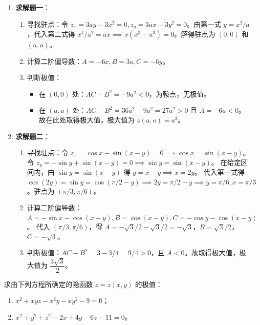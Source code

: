 \documentclass[lang=cn,11pt]{elegantbook}
\begin{document}
\begin{solution}
\begin{enumerate}
  \item \textbf{求解题一}：
  \begin{enumerate}
    \item 寻找驻点：令 $z_x = 3ay - 3x^2 = 0, z_y = 3ax - 3y^2 = 0$。由第一式 $y = x^2/a$，代入第二式得 $x^4/a^2 = ax \implies x(x^3-a^3)=0$。解得驻点为 $(0,0)$ 和 $(a,a)$。
    \item 计算二阶偏导数：$A = -6x, B = 3a, C = -6y$。
    \item 判断极值：
    \begin{itemize}
      \item 在 $(0,0)$ 处：$AC-B^2 = -9a^2 < 0$，为鞍点，无极值。
      \item 在 $(a,a)$ 处：$AC-B^2 = 36a^2 - 9a^2 = 27a^2 > 0$ 且 $A = -6a < 0$。故在此处取得极大值，极大值为 $z(a,a) = a^3$。
    \end{itemize}
  \end{enumerate}
  
  \item \textbf{求解题二}：
  \begin{enumerate}
    \item 寻找驻点：令 $z_x = \cos x - \sin(x-y) = 0 \implies \cos x = \sin(x-y)$。
    令 $z_y = -\sin y + \sin(x-y) = 0 \implies \sin y = \sin(x-y)$。
    在给定区间内，由 $\sin y = \sin(x-y)$ 得 $y = x-y \implies x=2y$。
    代入第一式得 $\cos(2y) = \sin y = \cos(\pi/2-y) \implies 2y = \pi/2-y \implies y=\pi/6, x=\pi/3$。驻点为 $(\pi/3, \pi/6)$。
    \item 计算二阶偏导数：$A = -\sin x - \cos(x-y), B = \cos(x-y), C = -\cos y - \cos(x-y)$。
    代入 $(\pi/3, \pi/6)$，得 $A = -\sqrt{3}/2 - \sqrt{3}/2 = -\sqrt{3}$，$B = \sqrt{3}/2$，$C = -\sqrt{3}$。
    \item 判断极值：$AC-B^2 = 3 - 3/4 = 9/4 > 0$，且 $A < 0$。故取得极大值，极大值为 $\dfrac{3\sqrt{3}}{2}$。
  \end{enumerate}
\end{enumerate}
\end{solution}



\begin{exercise}[隐函数确定的极值]
求由下列方程所确定的隐函数 $z=z(x,y)$ 的极值：
\begin{enumerate}
  \item $x^2+xyz-x^2y-xy^2-9=0$；
  \item $x^2+y^2+z^2-2x+4y-6z-11=0$。
\end{enumerate}
\end{exercise}
\end{document}
